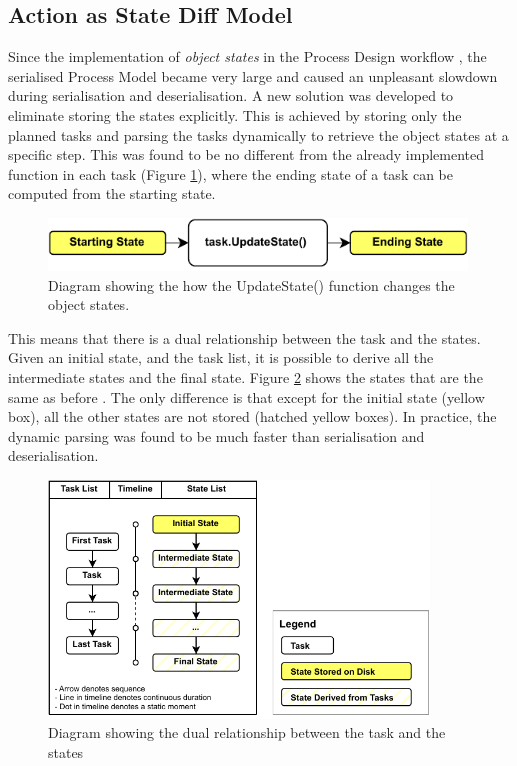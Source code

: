 \subsection{Action as State Diff Model} 
\label{subsection:exploration-4-action-as-state-diff-model}

Since the implementation of \textit{object states} in the Process Design workflow , the serialised Process Model became very large and caused an unpleasant slowdown during serialisation and deserialisation. A new solution was developed to eliminate storing the states explicitly. 
This is achieved by storing only the planned tasks and parsing the tasks dynamically to retrieve the object states at a specific step. This was found to be no different from the already implemented  function in each task (Figure \ref{fig:update-state-function}), where the ending state of a task can be computed from the starting state. 

\begin{figure}[!h]
    \centering
    \includegraphics[width=0.99\textwidth]{images/7a/updatestate.pdf}
    \caption{Diagram showing the how the UpdateState() function changes the object states.}
    \label{fig:update-state-function}
\end{figure}

This means that there is a dual relationship between the task and the states. Given an initial state, and the task list, it is possible to derive all the intermediate states and the final state. Figure \ref{fig:dual-relationship-between-the-task-and-the-states} shows the states that are the same as before . The only difference is that except for the initial state (yellow box), all the other states are not stored (hatched yellow boxes). In practice, the dynamic parsing was found to be much faster than serialisation and deserialisation.

\begin{figure}[!h]
    \centering
    \includegraphics[width=0.90\textwidth]{images/7a/initial-state-only.pdf}
    \caption{Diagram showing the dual relationship between the task and the states}
    \label{fig:dual-relationship-between-the-task-and-the-states}
\end{figure}

